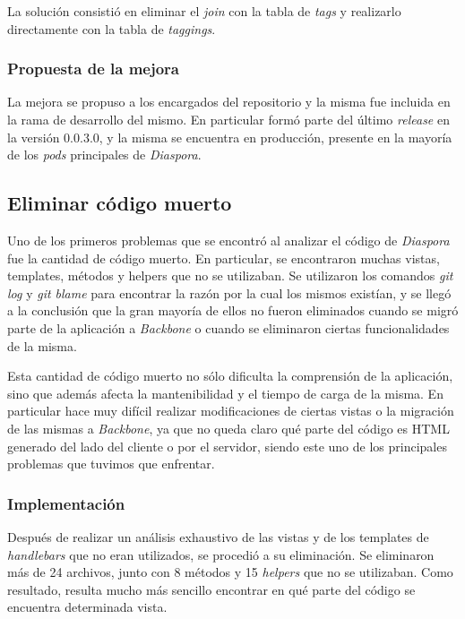 La solución consistió en eliminar el \emph{join} con la tabla de \emph{tags} y realizarlo directamente con la tabla de \emph{taggings}.

\subsubsection{Propuesta de la mejora}

La mejora se propuso a los encargados del repositorio y la misma fue incluida en la rama de desarrollo del mismo. En particular formó parte del último \emph{release} en la
versión 0.0.3.0, y la misma se encuentra en producción, presente en la mayoría de los \emph{pods} principales de \emph{Diaspora}.


\subsection{Eliminar código muerto}

Uno de los primeros problemas que se encontró al analizar el código de \emph{Diaspora} fue la cantidad de código muerto. En particular, se encontraron muchas vistas, templates,
métodos y helpers que no se utilizaban. Se utilizaron los comandos \emph{git log} y \emph{git blame} para encontrar la razón por la cual los mismos existían, y se llegó a la conclusión 
que la gran mayoría de ellos no fueron eliminados cuando se migró parte de la aplicación a \emph{Backbone} o cuando se eliminaron ciertas funcionalidades de la misma.

Esta cantidad de código muerto no sólo dificulta la comprensión de la aplicación, sino que además afecta la mantenibilidad y el tiempo de carga de la misma. En particular hace muy
difícil realizar modificaciones de ciertas vistas o la migración de las mismas a \emph{Backbone}, ya que no queda claro qué parte del código es HTML generado del lado del cliente o por el servidor, siendo este uno de los principales problemas que tuvimos que enfrentar.

\subsubsection{Implementación}

Después de realizar un análisis exhaustivo de las vistas y de los templates de \emph{handlebars} \cite{handlebars} que no eran utilizados, se procedió a su eliminación. Se eliminaron más de 24
archivos, junto con 8 métodos y 15 \emph{helpers} que no se utilizaban. Como resultado, resulta mucho más sencillo encontrar en qué parte del código se encuentra
determinada vista.

